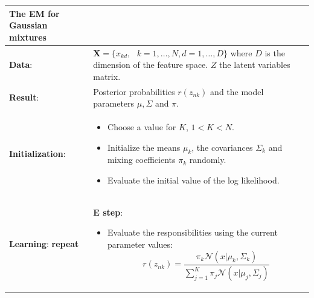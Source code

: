 \documentclass[]{book}
\providecommand{\tightlist}{%
  \setlength{\itemsep}{0pt}\setlength{\parskip}{0pt}}
\theoremstyle{definition}
\theoremstyle{definition}
\theoremstyle{definition}
\theoremstyle{remark}
\begin{document}
\begin{longtable}[]{@{}ll@{}}
\toprule
\begin{minipage}[b]{0.36\columnwidth}\raggedright\strut
The EM for Gaussian mixtures\strut
\end{minipage} & \begin{minipage}[b]{0.58\columnwidth}\raggedright\strut
\strut
\end{minipage}\tabularnewline
\midrule
\endhead
\begin{minipage}[t]{0.36\columnwidth}\raggedright\strut
\textbf{Data}:\strut
\end{minipage} & \begin{minipage}[t]{0.58\columnwidth}\raggedright\strut
\(\mathbf{X}= \{x_{kd}, \,\,\,\, k=1,\ldots,N, d=1,\ldots,D\}\) where
\(D\) is the dimension of the feature space. \(Z\) the latent variables
matrix.\strut
\end{minipage}\tabularnewline
\begin{minipage}[t]{0.36\columnwidth}\raggedright\strut
\textbf{Result}:\strut
\end{minipage} & \begin{minipage}[t]{0.58\columnwidth}\raggedright\strut
Posterior probabilities \(r(z_{nk})\) and the model parameters
\(\mu,\Sigma\) and \(\pi\).\strut
\end{minipage}\tabularnewline
\begin{minipage}[t]{0.48\columnwidth}\raggedright\strut
\textbf{Initialization}:\strut
\end{minipage} & \begin{minipage}[t]{0.48\columnwidth}\raggedright\strut
\begin{itemize}
\tightlist
\item
  Choose a value for \(K\), \(1 < K < N\).
\item
  Initialize the means \(\mu_k\), the covariances \(\Sigma_k\) and
  mixing coefficients \(\pi_k\) randomly.
\item
  Evaluate the initial value of the log likelihood.
\end{itemize}\strut
\end{minipage}\tabularnewline
\begin{minipage}[t]{0.48\columnwidth}\raggedright\strut
\textbf{Learning}: \textbf{repeat}\strut
\end{minipage} & \begin{minipage}[t]{0.48\columnwidth}\raggedright\strut
\textbf{E step}:

\begin{itemize}
\tightlist
\item
  Evaluate the responsibilities using the current parameter values:
  \[r(z_{nk})= \frac{\pi_k \mathcal{N}(x| \mu_k, \Sigma_k)}{\displaystyle \sum_{j=1}^{K} \pi_j \mathcal{N}(x| \mu_j, \Sigma_j)}\]
\end{itemize}


\end{minipage}
\end{longtable}
\end{document}
